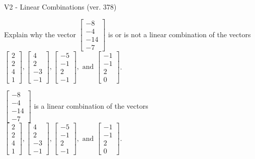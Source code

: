 \begin{exercise}
  \begin{exerciseTitle}V2 - Linear Combinations (ver. 378)\end{exerciseTitle}
  \begin{exerciseStatement}
    Explain why the vector \(\left[\begin{array}{c}
-8 \\
-4 \\
-14 \\
-7
\end{array}\right]\)  is or is not a linear 
	combination of the vectors \(\left[\begin{array}{c}
2 \\
2 \\
4 \\
1
\end{array}\right] , \left[\begin{array}{c}
4 \\
2 \\
-3 \\
-1
\end{array}\right] , \left[\begin{array}{c}
-5 \\
-1 \\
2 \\
-1
\end{array}\right] , \text{ and } \left[\begin{array}{c}
-1 \\
-1 \\
2 \\
0
\end{array}\right]\).
	


  \end{exerciseStatement}
  \begin{exerciseAnswer}
   \(\left[\begin{array}{c}
-8 \\
-4 \\
-14 \\
-7
\end{array}\right]\) 
  	 is  
	a linear combination of the vectors \(\left[\begin{array}{c}
2 \\
2 \\
4 \\
1
\end{array}\right] , \left[\begin{array}{c}
4 \\
2 \\
-3 \\
-1
\end{array}\right] , \left[\begin{array}{c}
-5 \\
-1 \\
2 \\
-1
\end{array}\right] , \text{ and } \left[\begin{array}{c}
-1 \\
-1 \\
2 \\
0
\end{array}\right]\).


\end{exerciseAnswer}
\end{exercise}
